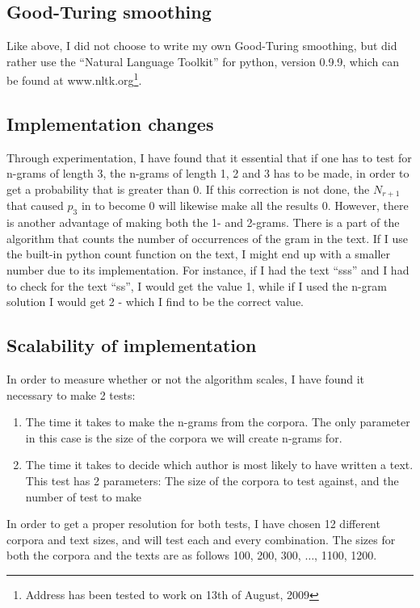 \subsection{Good-Turing smoothing}
Like above, I did not choose to write my own Good-Turing smoothing, but did rather use the ``Natural Language Toolkit'' for python, version 0.9.9, which can be found at www.nltk.org\footnote{Address has been tested to work on 13th of August, 2009}.

\subsection{Implementation changes}
Through experimentation, I have found that it essential that if one has to test for n-grams of length 3, the n-grams of length 1, 2 and 3 has to be made, in order to get a probability that is greater than 0. If this correction is not done, the $N_{r+1}$ that caused $p_3$ in  to become 0 will likewise make all the results 0. However, there is another advantage of making both the 1- and 2-grams. There is a part of the algorithm that counts the number of occurrences of the gram in the text. If I use the built-in python count function on the text, I might end up with a smaller number due to its implementation. For instance, if I had the text ``sss'' and I had to check for the text ``ss'', I would get the value 1, while if I used the n-gram solution I would get 2 - which I find to be the correct value.

\subsection{Scalability of implementation}
In order to measure whether or not the algorithm scales, I have found it necessary to make 2 tests: 
\begin{enumerate}
\item The time it takes to make the n-grams from the corpora. The only parameter in this case is the size of the corpora we will create n-grams for.
\item The time it takes to decide which author is most likely to have written a text. This test has 2 parameters: The size of the corpora to test against, and the number of test to make
\end{enumerate}

In order to get a proper resolution for both tests, I have chosen 12 different corpora and text sizes, and will test each and every combination. The sizes for both the corpora and the texts are as follows 100, 200, 300, $\ldots$, 1100, 1200.\\

